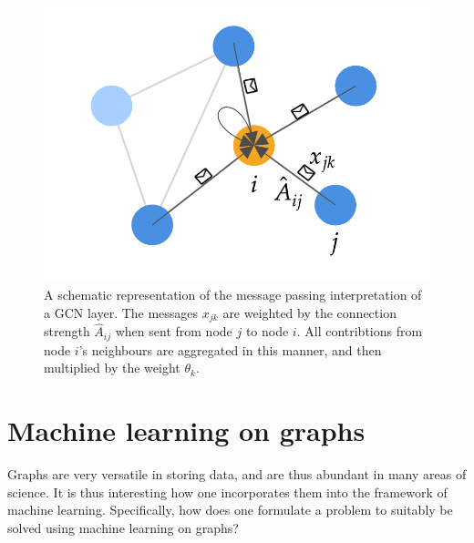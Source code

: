 \begin{figure}[H]
    \centering
    \includegraphics[width=0.5\linewidth]{chapters/images_theory/message_passing.png}
    \caption{A schematic representation of the message passing interpretation of a GCN layer. The messages $x_{jk}$ are weighted by the connection strength $\hat{A}_{ij}$ when sent from node $j$ to node $i$. All contribtions from node $i$'s neighbours are aggregated in this manner, and then multiplied by the weight $\theta_k$.}
    \label{fig:message_passing}
\end{figure}



\section{Machine learning on graphs}
\label{sec:ml_on_graphs}

Graphs are very versatile in storing data, and are thus abundant in many areas of science. It is thus interesting how one incorporates them into the framework of machine learning. Specifically, how does one formulate a problem to suitably be solved using machine learning on graphs? 

%         

